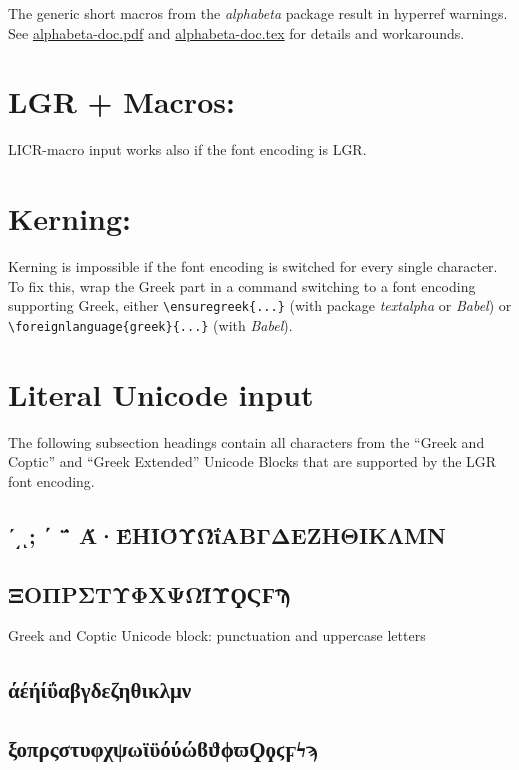 \documentclass{article}
\begin{document}
The generic short macros from the \emph{alphabeta} package result in
hyperref warnings. See \href{alphabeta-doc.pdf}{alphabeta-doc.pdf} and 
\href{alphabeta-doc.tex}{alphabeta-doc.tex}
for details and workarounds.


\section{LGR + Macros: \foreignlanguage{greek}{
  \textlambda\textomicron\textgamma\textomicron\textvarsigma{}}}

LICR-macro input works also if the font encoding is LGR.

\section{%
  Kerning: \textAlpha\textUpsilon\textLambda{}
  	   \ensuregreek{\textAlpha\textUpsilon\textLambda}
  	   \foreignlanguage{greek}{\textAlpha\textUpsilon\textLambda}%
}

Kerning is impossible if the font encoding is switched for every single
character. To fix this, wrap the Greek part in a command switching to a font
encoding supporting Greek, either \verb+\ensuregreek{...}+ (with package
\emph{textalpha} or \emph{Babel}) or \verb+\foreignlanguage{greek}{...}+
(with \emph{Babel}).

\section{Literal Unicode input}
The following subsection headings contain all characters from the ``Greek
and Coptic'' and ``Greek Extended'' Unicode Blocks that are supported by the
LGR font encoding.
\subsection{ʹ͵ͺ; ΄ ΅ Ά·ΈΉΊΌΎΏΐΑΒΓΔΕΖΗΘΙΚΛΜΝ}
\subsection{ΞΟΠΡΣΤΥΦΧΨΩΪΫϘϚϜϠ}
Greek and Coptic Unicode block: punctuation and uppercase letters

\subsection{άέήίΰαβγδεζηθικλμν}
\subsection{ξοπρςστυφχψωϊϋόύώϐϑϕϖϘϙϛϝϟϡ}
\end{document}
